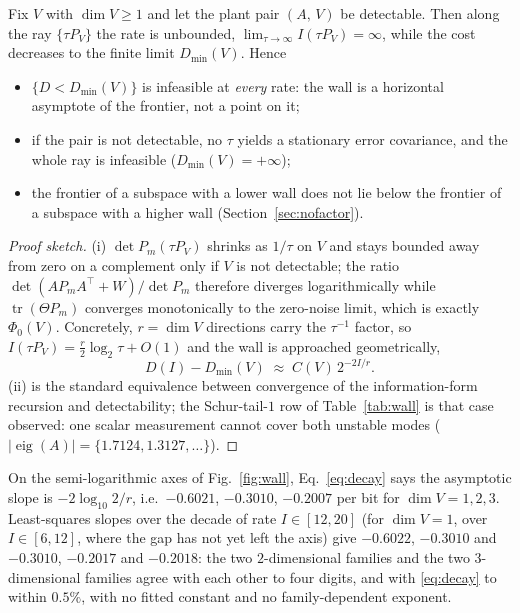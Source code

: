 \begin{proposition}
\label{pr:region}
Fix $V$ with $\dim V\ge1$ and let the plant pair $(A,\,V)$ be detectable. Then
along the ray $\{\tau P_V\}$ the rate is unbounded,
$\lim_{\tau\to\infty} I(\tau P_V)=\infty$, while the cost decreases to the
finite limit $D_{\min}(V)$. Hence
\begin{itemize}
 \item[(i)] $\{D<D_{\min}(V)\}$ is infeasible at \emph{every} rate: the wall is
 a horizontal asymptote of the frontier, not a point on it;
 \item[(ii)] if the pair is not detectable, no $\tau$ yields a stationary
 error covariance, and the whole ray is infeasible
 ($D_{\min}(V)=+\infty$);
 \item[(iii)] the frontier of a subspace with a lower wall does not lie below
 the frontier of a subspace with a higher wall (Section~\ref{sec:nofactor}).
\end{itemize}
\end{proposition}

\begin{proof}[Proof sketch]
(i) $\det P_m(\tau P_V)$ shrinks as $1/\tau$ on $V$ and stays bounded away from
zero on a complement only if $V$ is not detectable; the ratio
$\det(A P_m A^{\top}+W)/\det P_m$ therefore diverges logarithmically while
$\operatorname{tr}(\Theta P_m)$ converges monotonically to the zero-noise limit,
which is exactly $\Phi_0(V)$. Concretely, $r=\dim V$ directions carry the
$\tau^{-1}$ factor, so $I(\tau P_V)=\tfrac r2\log_2\tau+O(1)$ and the wall is
approached geometrically,
\begin{equation}
 D(I)-D_{\min}(V)\;\approx\;C(V)\,2^{-2I/r}.
\label{eq:decay}
\end{equation}
(ii) is the standard equivalence between convergence of the information-form
recursion and detectability; the Schur-tail-$1$ row of Table~\ref{tab:wall} is
that case observed: one scalar measurement cannot cover both unstable modes
($|\operatorname{eig}(A)|=\{1.7124,1.3127,\dots\}$).
\end{proof}

\begin{remark}
\label{rmk:slope}
On the semi-logarithmic axes of Fig.~\ref{fig:wall}, Eq.~\eqref{eq:decay} says
the asymptotic slope is $-2\log_{10}2/r$, i.e.\ $-0.6021$, $-0.3010$, $-0.2007$
per bit for $\dim V=1,2,3$. Least-squares slopes over the decade of rate
$I\in[12,20]$ (for $\dim V=1$, over $I\in[6,12]$, where the gap has not yet left
the axis) give $-0.6022$, $-0.3010$ and $-0.3010$, $-0.2017$ and $-0.2018$: the
two $2$-dimensional families and the two $3$-dimensional families agree with
each other to four digits, and with \eqref{eq:decay} to within $0.5\%$, with no
fitted constant and no family-dependent exponent.

\end{remark}

